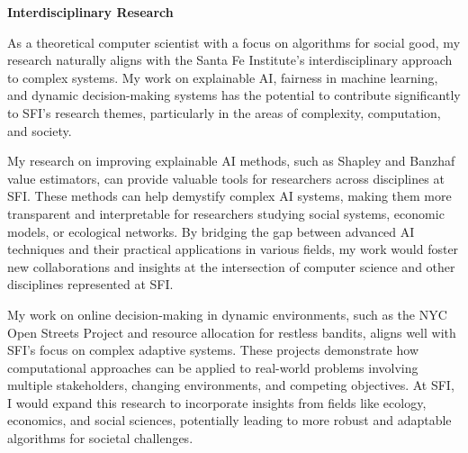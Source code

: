 \documentclass[11pt]{article}
\begin{document}
{\setlength{\parindent}{0cm}

{\large \textbf{Interdisciplinary Research}}

As a theoretical computer scientist with a focus on algorithms for social good, my research naturally aligns with the Santa Fe Institute's interdisciplinary approach to complex systems. My work on explainable AI, fairness in machine learning, and dynamic decision-making systems has the potential to contribute significantly to SFI's research themes, particularly in the areas of complexity, computation, and society.

My research on improving explainable AI methods, such as Shapley and Banzhaf value estimators, can provide valuable tools for researchers across disciplines at SFI. These methods can help demystify complex AI systems, making them more transparent and interpretable for researchers studying social systems, economic models, or ecological networks. By bridging the gap between advanced AI techniques and their practical applications in various fields, my work would foster new collaborations and insights at the intersection of computer science and other disciplines represented at SFI.

My work on online decision-making in dynamic environments, such as the NYC Open Streets Project and resource allocation for restless bandits, aligns well with SFI's focus on complex adaptive systems. These projects demonstrate how computational approaches can be applied to real-world problems involving multiple stakeholders, changing environments, and competing objectives. At SFI, I would expand this research to incorporate insights from fields like ecology, economics, and social sciences, potentially leading to more robust and adaptable algorithms for societal challenges.

}
\end{document}
